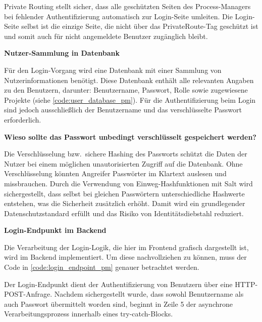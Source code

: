 Private Routing stellt sicher, dass alle geschützten Seiten des Process-Managers bei fehlender Authentifizierung automatisch zur Login-Seite umleiten. Die Login-Seite selbst ist die einzige Seite, die nicht über das PrivateRoute-Tag geschützt ist und somit auch für nicht angemeldete Benutzer zugänglich bleibt.

\textbf{Nutzer-Sammlung in Datenbank}

Für den Login-Vorgang wird eine Datenbank mit einer Sammlung von Nutzerinformationen benötigt. Diese Datenbank enthält alle relevanten Angaben zu den Benutzern, darunter: Benutzername, Passwort, Rolle sowie zugewiesene Projekte (siehe \autoref{code:user_database_pm}). Für die Authentifizierung beim Login sind jedoch ausschließlich der Benutzername und das verschlüsselte Passwort erforderlich.


\textbf{Wieso sollte das Passwort unbedingt verschlüsselt gespeichert werden?}

Die Verschlüsselung bzw.\ sichere Hashing des Passworts schützt die Daten der Nutzer bei einem möglichen unautorisierten Zugriff auf die Datenbank. Ohne Verschlüsselung könnten Angreifer Passwörter im Klartext auslesen und missbrauchen. Durch die Verwendung von Einweg-Hashfunktionen mit Salt wird sichergestellt, dass selbst bei gleichen Passwörtern unterschiedliche Hashwerte entstehen, was die Sicherheit zusätzlich erhöht. Damit wird ein grundlegender Datenschutzstandard erfüllt und das Risiko von Identitätsdiebstahl reduziert.

\textbf{Login-Endpunkt im Backend}

Die Verarbeitung der Login-Logik, die hier im Frontend grafisch dargestellt ist, wird im Backend implementiert. Um diese nachvollziehen zu können, muss der Code in \autoref{code:login_endpoint_pm} genauer betrachtet werden.


Der Login-Endpunkt dient der Authentifizierung von Benutzern über eine HTTP-POST-Anfrage. Nachdem sichergestellt wurde, dass sowohl Benutzername als auch Passwort übermittelt worden sind, beginnt in Zeile 5 der asynchrone Verarbeitungsprozess innerhalb eines try-catch-Blocks.


